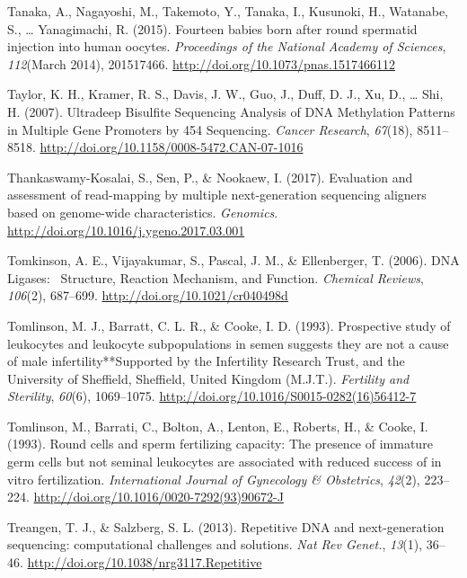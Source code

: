 \documentclass[12pt,twoside]{reedthesis}
\theoremstyle{definition}
\theoremstyle{definition}
\theoremstyle{remark}
\begin{document}
  \hypertarget{ref-Tanaka2015}{}
  Tanaka, A., Nagayoshi, M., Takemoto, Y., Tanaka, I., Kusunoki, H.,
  Watanabe, S., \ldots{} Yanagimachi, R. (2015). Fourteen babies born
  after round spermatid injection into human oocytes. \emph{Proceedings of
  the National Academy of Sciences}, \emph{112}(March 2014), 201517466.
  \url{http://doi.org/10.1073/pnas.1517466112}
  
  \hypertarget{ref-Taylor2007}{}
  Taylor, K. H., Kramer, R. S., Davis, J. W., Guo, J., Duff, D. J., Xu,
  D., \ldots{} Shi, H. (2007). Ultradeep Bisulfite Sequencing Analysis of
  DNA Methylation Patterns in Multiple Gene Promoters by 454 Sequencing.
  \emph{Cancer Research}, \emph{67}(18), 8511--8518.
  \url{http://doi.org/10.1158/0008-5472.CAN-07-1016}
  
  \hypertarget{ref-Thankaswamy-Kosalai2017}{}
  Thankaswamy-Kosalai, S., Sen, P., \& Nookaew, I. (2017). Evaluation and
  assessment of read-mapping by multiple next-generation sequencing
  aligners based on genome-wide characteristics. \emph{Genomics}.
  \url{http://doi.org/10.1016/j.ygeno.2017.03.001}
  
  \hypertarget{ref-Tomkinson2006}{}
  Tomkinson, A. E., Vijayakumar, S., Pascal, J. M., \& Ellenberger, T.
  (2006). DNA Ligases:~ Structure, Reaction Mechanism, and Function.
  \emph{Chemical Reviews}, \emph{106}(2), 687--699.
  \url{http://doi.org/10.1021/cr040498d}
  
  \hypertarget{ref-Tomlinson1993}{}
  Tomlinson, M. J., Barratt, C. L. R., \& Cooke, I. D. (1993). Prospective
  study of leukocytes and leukocyte subpopulations in semen suggests they
  are not a cause of male infertility**Supported by the Infertility
  Research Trust, and the University of Sheffield, Sheffield, United
  Kingdom (M.J.T.). \emph{Fertility and Sterility}, \emph{60}(6),
  1069--1075. \url{http://doi.org/10.1016/S0015-0282(16)56412-7}
  
  \hypertarget{ref-Tomlinson1993a}{}
  Tomlinson, M., Barrati, C., Bolton, A., Lenton, E., Roberts, H., \&
  Cooke, I. (1993). Round cells and sperm fertilizing capacity: The
  presence of immature germ cells but not seminal leukocytes are
  associated with reduced success of in vitro fertilization.
  \emph{International Journal of Gynecology \& Obstetrics}, \emph{42}(2),
  223--224. \url{http://doi.org/10.1016/0020-7292(93)90672-J}
  
  \hypertarget{ref-Treangen2013}{}
  Treangen, T. J., \& Salzberg, S. L. (2013). Repetitive DNA and
  next-generation sequencing: computational challenges and solutions.
  \emph{Nat Rev Genet.}, \emph{13}(1), 36--46.
  \url{http://doi.org/10.1038/nrg3117.Repetitive}
  
\end{document}
